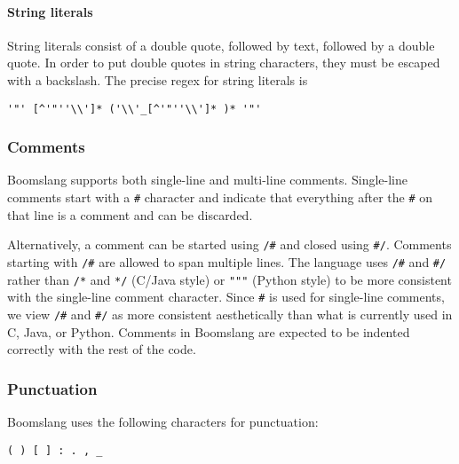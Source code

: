 \documentclass{article}
\begin{document}
\paragraph{String literals}
String literals consist of a double quote, followed by text, followed by a double quote. In order to put double quotes in string characters, they must be escaped with a backslash. The precise regex for string literals is \begin{verbatim}
'"' [^'"''\\']* ('\\'_[^'"''\\']* )* '"'
\end{verbatim}

\subsubsection{Comments}
Boomslang supports both single-line and multi-line comments. Single-line comments start with a \texttt{\#} character and indicate that everything after the \texttt{\#} on that line is a comment and can be discarded.

Alternatively, a comment can be started using \texttt{/\#} and closed using \texttt{\#/}. Comments starting with \texttt{/\#} are allowed to span multiple lines. The language uses \texttt{/\#} and \texttt{\#/} rather than \texttt{/*} and \texttt{*/} (C/Java style) or \texttt{"""} (Python style) to be more consistent with the single-line comment character. Since \texttt{\#} is used for single-line comments, we view \texttt{/\#} and \texttt{\#/} as more consistent aesthetically than what is currently used in C, Java, or Python. Comments in Boomslang are expected to be indented correctly with the rest of the code.

\subsubsection{Punctuation}
Boomslang uses the following characters for punctuation:
\begin{verbatim}
( ) [ ] : . , _
\end{verbatim}
\end{document}
